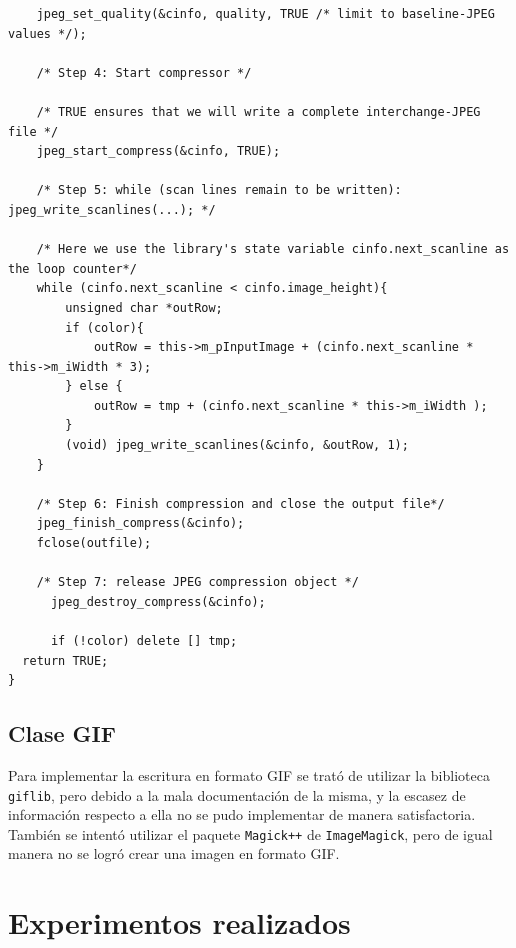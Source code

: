 \begin{verbatim}
    jpeg_set_quality(&cinfo, quality, TRUE /* limit to baseline-JPEG values */);
    
    /* Step 4: Start compressor */
    
    /* TRUE ensures that we will write a complete interchange-JPEG file */
    jpeg_start_compress(&cinfo, TRUE);
    
    /* Step 5: while (scan lines remain to be written): jpeg_write_scanlines(...); */
    
    /* Here we use the library's state variable cinfo.next_scanline as the loop counter*/
    while (cinfo.next_scanline < cinfo.image_height){
        unsigned char *outRow;
        if (color){
      		outRow = this->m_pInputImage + (cinfo.next_scanline * this->m_iWidth * 3);
      	} else {
      		outRow = tmp + (cinfo.next_scanline * this->m_iWidth );
      	}
        (void) jpeg_write_scanlines(&cinfo, &outRow, 1);
    }
    
    /* Step 6: Finish compression and close the output file*/
    jpeg_finish_compress(&cinfo);
    fclose(outfile);
    
    /* Step 7: release JPEG compression object */
      jpeg_destroy_compress(&cinfo);
    
      if (!color) delete [] tmp;
  return TRUE;
}

\end{verbatim}


\subsection{Clase GIF}
Para implementar la escritura en formato GIF se trató de utilizar la biblioteca \texttt{giflib}, pero debido a la mala documentación de la misma, y la escasez de información respecto a ella no se pudo implementar de manera satisfactoria. También se intentó utilizar el paquete \texttt{Magick++} de \texttt{ImageMagick}, pero de igual manera no se logró crear una imagen en formato GIF.

\section{Experimentos realizados}

